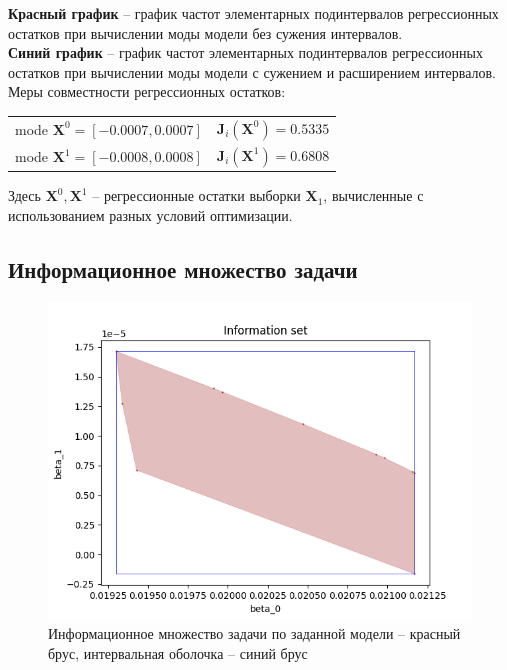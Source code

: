 \FloatBarrier

\textbf{Красный график} -- график частот элементарных подинтервалов регрессионных остатков при вычислении моды модели без сужения интервалов. \\
\textbf{Синий график} -- график частот элементарных подинтервалов регрессионных остатков при вычислении моды модели с сужением и расширением интервалов. \\

Меры совместности регрессионных остатков: \\

\begin{tabular}{c c}
	mode $\bm{X}^0 = [-0.0007, 0.0007]$ & $\bm{J}_i(\bm{X}^0) = 0.5335$ \\
	mode $\bm{X}^1 = [-0.0008, 0.0008]$ & $\bm{J}_i(\bm{X}^1) = 0.6808$ \\
\end{tabular}

Здесь $\bm{X}^{0}, \bm{X}^{1}$ -- регрессионные остатки выборки $\bm{X}_1$, вычисленные с использованием разных условий оптимизации. \\

\FloatBarrier
\subsection{Информационное множество задачи} 


\begin{figure}[ht]
	\begin{center}
		\includegraphics[scale = 0.55]{../images/inform_set.png}
	\end{center}
	\caption{Информационное множество задачи по заданной модели -- красный брус, интервальная оболочка -- синий брус}
\end{figure}

